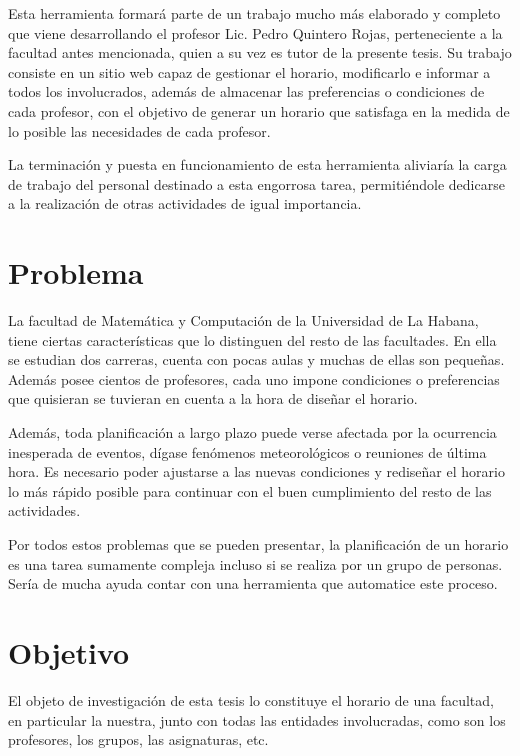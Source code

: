 \begin{introduction}
Esta herramienta formará parte de un trabajo mucho más elaborado y completo que viene desarrollando
el profesor Lic. Pedro Quintero Rojas, perteneciente a la facultad antes mencionada, quien a su vez
es tutor de la presente tesis. Su trabajo consiste en un sitio web capaz de gestionar el horario,
modificarlo e informar a todos los involucrados, además de almacenar las preferencias o condiciones
de cada profesor, con el objetivo de generar un horario que satisfaga en la medida de lo posible
las necesidades de cada profesor.

La terminación y puesta en funcionamiento de esta herramienta aliviar\'ia la carga de trabajo del
personal destinado a esta engorrosa tarea, permiti\'endole dedicarse a la realización de otras
actividades de igual importancia.

\section*{Problema}

La facultad de Matemática y Computación de la Universidad de La Habana, tiene ciertas
características que lo distinguen del resto de las facultades. En ella se estudian dos carreras,
cuenta con pocas aulas y muchas de ellas son pequeñas. Adem\'as posee cientos de profesores, cada uno
impone condiciones o preferencias que quisieran se tuvieran en cuenta a la hora de diseñar el horario.

Además, toda planificación a largo plazo puede verse afectada por la ocurrencia inesperada de eventos,
d\'igase fenómenos meteorológicos o reuniones de última hora. Es necesario poder ajustarse a las nuevas
condiciones y rediseñar el horario lo más rápido posible para continuar con el buen cumplimiento del
resto de las actividades.

Por todos estos problemas que se pueden presentar, la planificación de un horario es una tarea sumamente 
compleja incluso si se realiza por un grupo de personas. Ser\'ia de mucha ayuda contar con una herramienta
que automatice este proceso.

\section*{Objetivo}

El objeto de investigación de esta tesis lo constituye el horario de una facultad, en particular la nuestra,
junto con todas las entidades involucradas, como son los profesores, los grupos, las asignaturas, etc.


\end{introduction}
